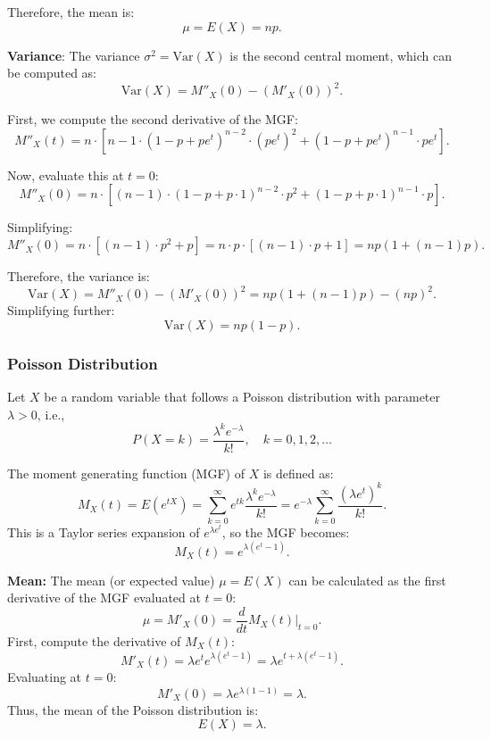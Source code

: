     Therefore, the mean is:
    \[
    \mu = E(X) = n p.
    \]

    \textbf{Variance}: The variance \( \sigma^2 = \text{Var}(X) \) is the second central moment, which can be computed as:
    \[
    \text{Var}(X) = M''_X(0) - \left( M'_X(0) \right)^2.
    \]
    
    First, we compute the second derivative of the MGF:
    \[
    M''_X(t) = n \cdot \left[ n-1 \cdot \left( 1 - p + p e^t \right)^{n-2} \cdot (p e^t)^2 + \left( 1 - p + p e^t \right)^{n-1} \cdot p e^t \right].
    \]
    
    Now, evaluate this at \( t = 0 \):
    \[
    M''_X(0) = n \cdot \left[ (n-1) \cdot \left( 1 - p + p \cdot 1 \right)^{n-2} \cdot p^2 + \left( 1 - p + p \cdot 1 \right)^{n-1} \cdot p \right].
    \]
    
    Simplifying:
    \[
    M''_X(0) = n \cdot \left[ (n-1) \cdot p^2 + p \right] = n \cdot p \cdot \left[ (n-1) \cdot p + 1 \right] = n p (1 + (n-1) p).
    \]
    
    Therefore, the variance is:
    \[
    \text{Var}(X) = M''_X(0) - (M'_X(0))^2 = n p (1 + (n-1) p) - (n p)^2.
    \]
    Simplifying further:
    \[
    \text{Var}(X) = n p (1 - p).
    \]

    \subsubsection{Poisson Distribution}

    Let \( X \) be a random variable that follows a Poisson distribution with parameter \( \lambda > 0 \), i.e.,
\[
P(X = k) = \frac{\lambda^k e^{-\lambda}}{k!}, \quad k = 0, 1, 2, \dots
\]

The moment generating function (MGF) of \( X \) is defined as:
\[
M_X(t) = E\left(e^{tX}\right) = \sum_{k=0}^{\infty} e^{tk} \frac{\lambda^k e^{-\lambda}}{k!} = e^{-\lambda} \sum_{k=0}^{\infty} \frac{(\lambda e^t)^k}{k!}.
\]
This is a Taylor series expansion of \( e^{\lambda e^t} \), so the MGF becomes:
\[
M_X(t) = e^{\lambda(e^t - 1)}.
\]

\textbf{Mean:} The mean (or expected value) \( \mu = E(X) \) can be calculated as the first derivative of the MGF evaluated at \( t = 0 \):
\[
\mu = M'_X(0) = \frac{d}{dt} M_X(t) \bigg|_{t=0}.
\]
First, compute the derivative of \( M_X(t) \):
\[
M'_X(t) = \lambda e^t e^{\lambda(e^t - 1)} = \lambda e^{t + \lambda(e^t - 1)}.
\]
Evaluating at \( t = 0 \):
\[
M'_X(0) = \lambda e^{\lambda(1 - 1)} = \lambda.
\]
Thus, the mean of the Poisson distribution is:
\[
E(X) = \lambda.
\]

